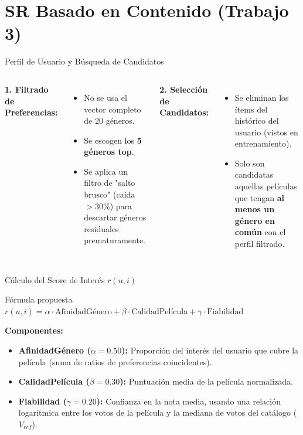 \documentclass[aspectratio=169]{beamer}
\begin{document}
\section{SR Basado en Contenido (Trabajo 3)}

\begin{frame}{Perfil de Usuario y Búsqueda de Candidatos}
  \begin{columns}[T]
      \textbf{1. Filtrado de Preferencias:}
      \begin{itemize}
        \item No se usa el vector completo de 20 géneros.
        \item Se escogen los \textbf{5 géneros top}.
        \item Se aplica un filtro de "salto brusco" (caída $>30\%$) para descartar géneros residuales prematuramente.
      \end{itemize}

      \textbf{2. Selección de Candidatos:}
      \begin{itemize}
        \item Se eliminan los ítems del histórico del usuario (vistos en entrenamiento).
        \item Solo son candidatas aquellas películas que tengan \textbf{al menos un género en común} con el perfil filtrado.
      \end{itemize}
  \end{columns}
\end{frame}

\begin{frame}{Cálculo del Score de Interés $r(u,i)$}
  \begin{block}{Fórmula propuesta}
    $r(u,i) = \alpha \cdot \text{AfinidadGénero} + \beta \cdot \text{CalidadPelícula} + \gamma \cdot \text{Fiabilidad}$
  \end{block}

  \vspace{0.3cm}
  \textbf{Componentes:}
  \begin{itemize}
    \item \textbf{AfinidadGénero ($\alpha=0.50$):} Proporción del interés del usuario que cubre la película (suma de ratios de preferencias coincidentes).
    \item \textbf{CalidadPelícula ($\beta=0.30$):} Puntuación media de la película normalizada.
    \item \textbf{Fiabilidad ($\gamma=0.20$):} Confianza en la nota media, usando una relación logarítmica entre los votos de la película y la mediana de votos del catálogo ($V_{ref}$).
  \end{itemize}
\end{frame}
\end{document}
